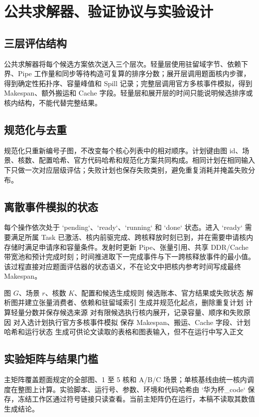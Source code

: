 \section{公共求解器、验证协议与实验设计}
\subsection{三层评估结构}
公共求解器将每个候选方案依次送入三个层次。轻量层使用驻留域字节、依赖下界、Pipe 工作量和同步等待构造可复算的排序分数；展开层调用题面核内步骤，得到确定性拓扑序、容量峰值和 Spill 记录；完整层调用官方多核事件模拟，得到 Makespan、额外搬运和 Cache 字段。轻量层和展开层的时间只能说明候选排序或核内结构，不能代替完整结果。

\subsection{规范化与去重}
规范化只重新编号子图，不改变每个核心列表中的相对顺序。计划键由图 id、场景、核数、配置哈希、官方代码哈希和规范化方案共同构成。相同计划在相同输入下只做一次对应层级评估；失败计划也保存失败类别，避免重复消耗并掩盖失败分布。

\subsection{离散事件模拟的状态}
每个操作依次处于 `pending`、`ready`、`running` 和 `done` 状态。进入 `ready` 需要满足所属 Task 已激活、核内前驱完成、跨核释放时刻已到，并在需要申请核内存储时满足申请序和容量条件。发射时更新 Pipe、张量引用、共享 DDR/Cache 带宽池和预计完成时刻；时间推进取下一完成事件与下一跨核释放事件的最小值。该过程直接对应题面评估器的状态语义，不在论文中把核内参考时间写成最终 Makespan。

\begin{algorithm}[H]\caption{公共候选评估流程}\begin{algorithmic}[1]
\REQUIRE 图 $G$、场景 $r$、核数 $K$、配置和候选生成规则
\ENSURE 候选账本、官方结果或失败状态
\STATE 解析图并建立张量消费者、依赖和驻留域索引
\STATE 生成并规范化起点，删除重复计划
\STATE 计算轻量分数并保存候选来源
\STATE 对有限候选执行核内展开，记录容量、顺序和失败原因
\STATE 对入选计划执行官方多核事件模拟
\STATE 保存 Makespan、搬运、Cache 字段、计划哈希和运行状态
\STATE 生成可供论文读取的表格和图表输入，但不在运行中写入正文
\end{algorithmic}\end{algorithm}

\subsection{实验矩阵与结果门槛}
主矩阵覆盖题面规定的全部图、1 至 5 核和 A/B/C 场景；单核基线由统一核内调度在整图上计算。实验脚本、运行号、参数、环境和代码哈希由 `华为杯\_code` 保存，冻结工作区通过符号链接只读查看。当前主矩阵仍在运行，本稿不读取其数值生成结论。

